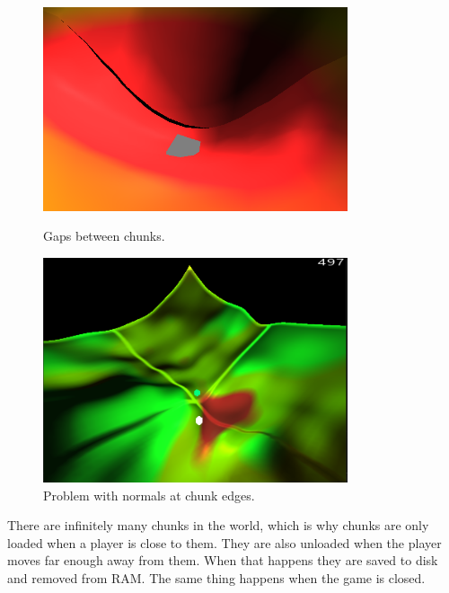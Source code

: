 \begin{figure}[H]
    \centering
    \begin{minipage}{0.45\textwidth}
        \centering
        \includegraphics[width=0.8\textwidth]{chapters/system_architecture/sections/terrain/resources/chunk_edges_gaps.png}
        \caption{Gaps between chunks.}
        \label{fig:gaps_between_chunks}
    \end{minipage}\hfill
    \begin{minipage}{0.45\textwidth}
        \centering
        \includegraphics[width=0.8\textwidth]{chapters/system_architecture/sections/terrain/resources/chunk_edges_normals_problem.png}
        \caption{Problem with normals at chunk edges.}
        \label{fig:problem_with_normals_at_chunk_edge}
    \end{minipage}
\end{figure}

There are infinitely many chunks in the world, which is why chunks are only loaded when a player is close to them.
They are also unloaded when the player moves far enough away from them.
When that happens they are saved to disk and removed from RAM.
The same thing happens when the game is closed.